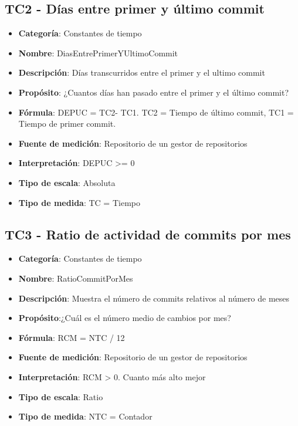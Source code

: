 \subsection{TC2 - Días entre primer y último commit}
\begin{itemize}
	\item \textbf{Categoría}: Constantes de tiempo
	\item \textbf{Nombre}: DiasEntrePrimerYUltimoCommit
	\item \textbf{Descripción}: Días transcurridos entre el primer y el ultimo commit 
	\item \textbf{Propósito}: ¿Cuantos días han pasado entre el primer y el último commit?
	\item \textbf{Fórmula}: DEPUC = TC2- TC1. TC2 = Tiempo de último commit, TC1 = Tiempo de primer commit.
	\item \textbf{Fuente de medición}: Repositorio de un gestor de repositorios
	\item \textbf{Interpretación}: DEPUC >= 0
	\item \textbf{Tipo de escala}: Absoluta
	\item \textbf{Tipo de medida}: TC = Tiempo
\end{itemize}
\subsection{TC3 - Ratio de actividad de commits por mes}
\begin{itemize}
	\item \textbf{Categoría}: Constantes de tiempo
	\item \textbf{Nombre}: RatioCommitPorMes
	\item \textbf{Descripción}: Muestra el número de commits relativos al número de meses
	\item \textbf{Propósito}:¿Cuál es el número medio de cambios por mes?
	\item \textbf{Fórmula}: RCM = NTC / 12
	\item \textbf{Fuente de medición}: Repositorio de un gestor de repositorios
	\item \textbf{Interpretación}: RCM > 0. Cuanto más alto mejor
	\item \textbf{Tipo de escala}: Ratio
	\item \textbf{Tipo de medida}: NTC = Contador
\end{itemize}
